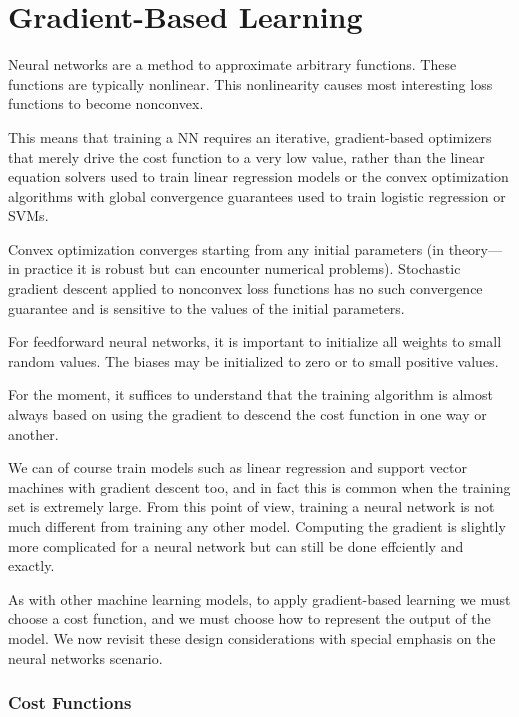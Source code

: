 \chapter{Gradient-Based Learning}
\label{gradient_based_learning}

Neural networks are a method to approximate arbitrary functions. These functions are typically
nonlinear. This nonlinearity  causes most interesting loss functions to become nonconvex.

This means that training a  NN requires an  iterative, gradient-based optimizers that merely drive the cost
function to a very low value, rather than the linear equation solvers used to train
linear regression models or the convex optimization algorithms with global convergence guarantees used to train logistic regression or SVMs. 

Convex optimization converges starting from any initial parameters (in theory—in practice it is robust
but can encounter numerical problems). Stochastic gradient descent applied to
nonconvex loss functions has no such convergence guarantee and is sensitive to the
values of the initial parameters. 

\begin{framed}
\begin{remark}
For feedforward neural networks, it is important to
initialize all weights to small random values. The biases may be initialized to zero
or to small positive values. 
\end{remark}
\end{framed}

For the moment, it suffices to understand that the training algorithm
is almost always based on using the gradient to descend the cost function in one
way or another. 


We can of course train models such as linear regression and support vector
machines with gradient descent too, and in fact this is common when the training
set is extremely large. From this point of view, training a neural network is not
much different from training any other model. Computing the gradient is slightly
more complicated for a neural network but can still be done effciently and exactly.

As with other machine learning models, to apply gradient-based learning we
must choose a cost function, and we must choose how to represent the output of
the model. We now revisit these design considerations with special emphasis on
the neural networks scenario.

\subsection{Cost Functions}

